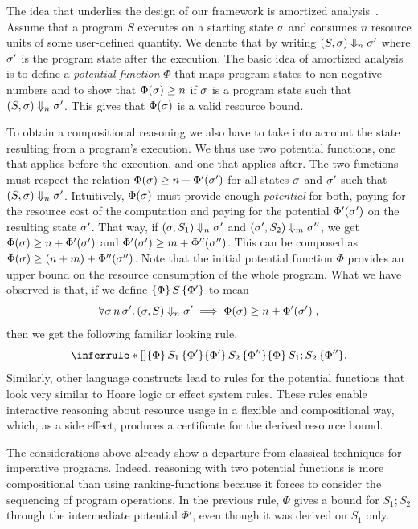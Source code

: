 \documentclass[nocopyrightspace,preprint,pldi]{sigplanconf-pldi15}
\begin{document}
The idea that underlies the design of our framework is amortized
analysis~\cite{Tarjan-amort}.  Assume that a program $S$ executes
on a starting state $\sigma$ and consumes $n$ resource units of
some user-defined quantity.  We denote that by writing $(S, \sigma)
\Downarrow_n \sigma'$ where $\sigma'$ is the program state after
the execution.  The basic idea of amortized analysis is to define a
\emph{potential function} $\Phi$ that maps program states to non-negative
numbers and to show that $\Phi(\sigma) \geq n$ if $\sigma$ is a program
state such that $(S, \sigma) \Downarrow_n \sigma'$.  This gives that
$\Phi(\sigma)$ is a valid resource bound.

To obtain a compositional reasoning we also have to take into account the
state resulting from a program's execution.  We thus use two potential
functions, one that applies before the execution, and one that applies
after.  The two functions must respect the relation $\Phi(\sigma)
\ge n + \Phi'(\sigma')$ for all states $\sigma$ and $\sigma'$ such
that $(S, \sigma) \Downarrow_n \sigma'$.  Intuitively, $\Phi(\sigma)$
must provide enough \emph{potential} for both, paying for the resource
cost of the computation and paying for the potential $\Phi'(\sigma')$ on
the resulting state $\sigma'$. That way, if $(\sigma, S_1) \Downarrow_n
\sigma'$ and $(\sigma', S_2) \Downarrow_m \sigma''$, we get $\Phi(\sigma)
\ge n + \Phi'(\sigma')$ and $\Phi'(\sigma') \ge m + \Phi''(\sigma'')$.
This can be composed as $\Phi(\sigma) \ge (n + m) + \Phi''(\sigma'')$.
Note that the initial potential function $\Phi$ provides an upper bound
on the resource consumption of the whole program.  What we have observed
is that, if we define $\{\Phi\}\, S\, \{\Phi'\}$ to mean
$$
\forall \sigma\, n\, \sigma'.\, (\sigma, S) \Downarrow_n \sigma' \implies \Phi(\sigma) \ge
n + \Phi'(\sigma') \; ,
$$
then we get the following familiar looking rule.
$$
\RuleNolabel
{\htriple{\Phi}{S_1}{\Phi'} \\ \htriple{\Phi'}{S_2}{\Phi''}}
{\htriple{\Phi} {S_1; S_2}  {\Phi''}}.
$$
%
Similarly, other language constructs lead to rules for the potential
functions that look very similar to Hoare logic or effect system
rules.  These rules enable interactive reasoning about resource usage
in a flexible and compositional way, which, as a side effect, produces
a certificate for the derived resource bound.

The considerations above already show a departure from classical
techniques for imperative programs.  Indeed, reasoning with two
potential functions is more compositional than using
ranking-functions because it forces to consider the sequencing of program
operations.  In the previous rule, $\Phi$ gives a bound for
$S_1; S_2$ through the intermediate potential $\Phi'$, even though
it was derived on $S_1$ only.
\end{document}
